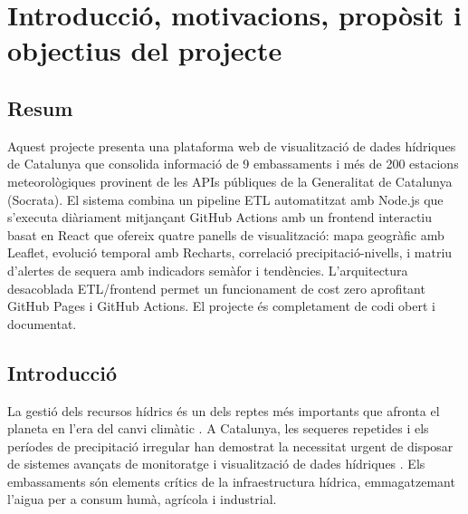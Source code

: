 

\chapter{Introducció, motivacions, propòsit i objectius del projecte}
\label{Ch:Introduction}


\section{Resum}

Aquest projecte presenta una plataforma web de visualització de dades hídriques de Catalunya que consolida informació de 9 embassaments i més de 200 estacions meteorològiques provinent de les APIs públiques de la Generalitat de Catalunya (Socrata). El sistema combina un pipeline ETL automatitzat amb Node.js que s'executa diàriament mitjançant GitHub Actions amb un frontend interactiu basat en React que ofereix quatre panells de visualització: mapa geogràfic amb Leaflet, evolució temporal amb Recharts, correlació precipitació-nivells, i matriu d'alertes de sequera amb indicadors semàfor i tendències. L'arquitectura desacoblada ETL/frontend permet un funcionament de cost zero aprofitant GitHub Pages i GitHub Actions. El projecte és completament de codi obert i documentat.


\section{Introducció}

La gestió dels recursos hídrics és un dels reptes més importants que afronta el planeta en l'era del canvi climàtic \cite{cambio_climatico}. A Catalunya, les sequeres repetides i els períodes de precipitació irregular han demostrat la necessitat urgent de disposar de sistemes avançats de monitoratge i visualització de dades hídriques \cite{sequera_catalunya}. Els embassaments són elements crítics de la infraestructura hídrica, emmagatzemant l'aigua per a consum humà, agrícola i industrial.

